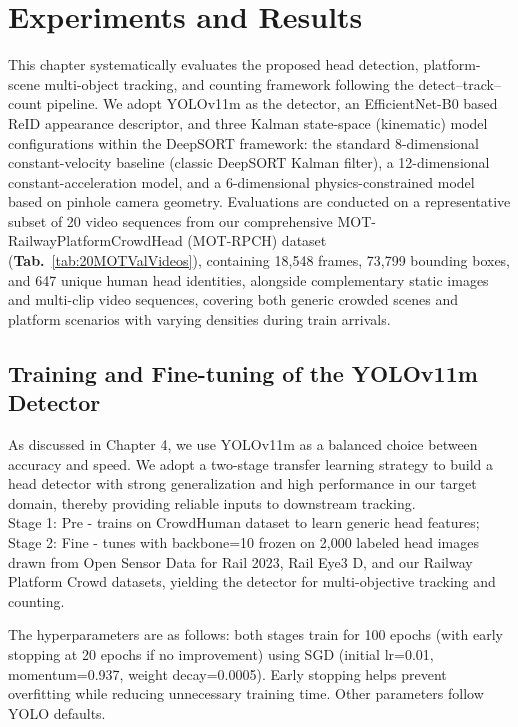\clearpage
\section{Experiments and Results}\label{section::Experiments and Results}


This chapter systematically evaluates the proposed head detection, platform-scene multi-object tracking, and counting framework following the detect–track–count pipeline. We adopt YOLOv11m as the detector, an EfficientNet-B0 based ReID appearance descriptor, and three Kalman state-space (kinematic) model configurations within the DeepSORT framework: the standard 8-dimensional constant-velocity baseline (classic DeepSORT Kalman filter), a 12-dimensional constant-acceleration model, and a 6-dimensional physics-constrained model based on pinhole camera geometry. Evaluations are conducted on a representative subset of 20 video sequences from our comprehensive MOT-RailwayPlatformCrowdHead (MOT-RPCH) dataset (\textbf{Tab.}~\ref{tab:20MOTValVideos}), containing 18,548 frames, 73,799 bounding boxes, and 647 unique human head identities, alongside complementary static images and multi-clip video sequences, covering both generic crowded scenes and platform scenarios with varying densities during train arrivals.


\subsection{Training and Fine-tuning of the YOLOv11m Detector}
As discussed in Chapter 4, we use YOLOv11m as a balanced choice between accuracy and speed. We adopt a two-stage transfer learning strategy to build a head detector with strong generalization and high performance in our target domain, thereby providing reliable inputs to downstream tracking. \\
Stage 1: Pre - trains on CrowdHuman dataset to learn generic head features; \\
Stage 2: Fine - tunes with backbone=10 frozen on 2,000 labeled head images drawn from Open Sensor Data for Rail 2023, Rail Eye3 D, and our Railway Platform Crowd datasets, yielding the detector for multi-objective tracking and counting.

The hyperparameters are as follows: both stages train for 100 epochs (with early stopping at 20 epochs if no improvement) using SGD (initial lr=0.01, momentum=0.937, weight decay=0.0005). Early stopping helps prevent overfitting while reducing unnecessary training time. Other parameters follow YOLO defaults.

